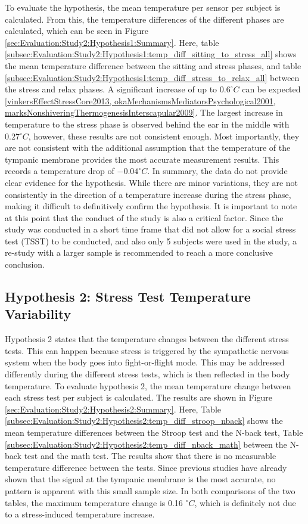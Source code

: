 To evaluate the hypothesis, the mean temperature per sensor per subject is calculated.
From this, the temperature differences of the different phases are calculated, which can be seen in Figure \ref{sec:Evaluation:Study2:Hypothesis1:Summary}.
Here, table \ref{subsec:Evaluation:Study2:Hypothesis1:temp_diff_sitting_to_stress_all} shows the mean temperature difference between the sitting and stress phases, and table \ref{subsec:Evaluation:Study2:Hypothesis1:temp_diff_stress_to_relax_all} between the stress and relax phases.
A significant increase of up to $0.6 ^\circ C$ can be expected \ref{vinkersEffectStressCore2013, okaMechanismsMediatorsPsychological2001, marksNonshiveringThermogenesisInterscapular2009}.
The largest increase in temperature to the stress phase is observed behind the ear in the middle with $0.27 ^\circ C$, however, these results are not consistent enough. 
Most importantly, they are not consistent with the additional assumption that the temperature of the tympanic membrane provides the most accurate measurement results.
This records a temperature drop of $-0.04 ^\circ C$.
In summary, the data do not provide clear evidence for the hypothesis. 
While there are minor variations, they are not consistently in the direction of a temperature increase during the stress phase, making it difficult to definitively confirm the hypothesis. 
It is important to note at this point that the conduct of the study is also a critical factor. 
Since the study was conducted in a short time frame that did not allow for a social stress test (TSST) to be conducted, and also only 5 subjects were used in the study, a re-study with a larger sample is recommended to reach a more conclusive conclusion.

\subsection{Hypothesis 2: Stress Test Temperature Variability}
\label{subsec:Evaluation:Study2:Hypothesis2}
Hypothesis 2 states that the temperature changes between the different stress tests. 
This can happen because stress is triggered by the sympathetic nervous system when the body goes into fight-or-flight mode.
This may be addressed differently during the different stress tests, which is then reflected in the body temperature.
To evaluate hypothesis 2, the mean temperature change between each stress test per subject is calculated.
The results are shown in Figure \ref{sec:Evaluation:Study2:Hypothesis2:Summary}. 
Here, Table \ref{subsec:Evaluation:Study2:Hypothesis2:temp_diff_stroop_nback} shows the mean temperature differences between the Stroop test and the N-back test, Table \ref{subsec:Evaluation:Study2:Hypothesis2:temp_diff_nback_math} between the N-back test and the math test.
The results show that there is no measurable temperature difference between the tests.
Since previous studies have already shown that the signal at the tympanic membrane is the most accurate, no pattern is apparent with this small sample size.
In both comparisons of the two tables, the maximum temperature change is 0.16 $ ^\circ C$, which is definitely not due to a stress-induced temperature increase.

